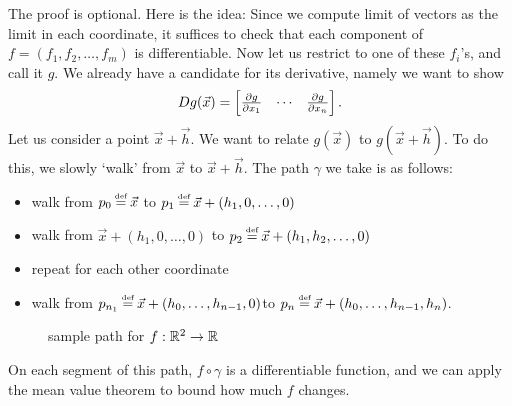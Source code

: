 The proof is optional. Here is the idea: Since we compute limit of vectors as the limit in each coordinate, it suffices to check that each component of $f= (f_1,f_2,\ldots, f_m)$ is differentiable. Now let us restrict to one of these $f_i$'s, and call it $g$. We already have a candidate for its derivative, namely we want to show \[
    Dg(\vec{x}) = \begin{bmatrix}
        \pdv{g}{x_1}(\vec{x}) & \cdots & \pdv{g}{x_n}(\vec{x})
    \end{bmatrix}.
\]
Let us consider a point $\vec{x}+\vec{h}$. We want to relate $g(\vec{x})$ to $g(\vec{x}+\vec{h})$. To do this, we slowly `walk' from $\vec{x}$ to $\vec{x}+\vec{h}$. The path $\gamma$ we take is as follows:
\begin{itemize}
    \item walk from $p_0\defeq\vec{x}$ to $p_1\defeq \vec{x}+(h_1,0,\ldots, 0)$
    \item walk from $\vec{x}+(h_1,0,\ldots, 0)$ to $p_2\defeq\vec{x}+(h_1,h_2,\ldots, 0)$
    \item repeat for each other coordinate
    \item walk from $p_{n_1}\defeq \vec{x}+(h_0,\ldots,h_{n-1}, 0)$to $p_n\defeq\vec{x}+(h_0,\ldots,h_{n-1}, h_n)$.
\end{itemize}
\begin{figure}[h]
    \centering
{}
\caption{sample path for $f:\mathbb{R}^2\to \mathbb{R}$}
\end{figure}
On each segment of this path, $f\circ \gamma$ is a differentiable function, and we can apply the mean value theorem to bound how much $f$ changes.
